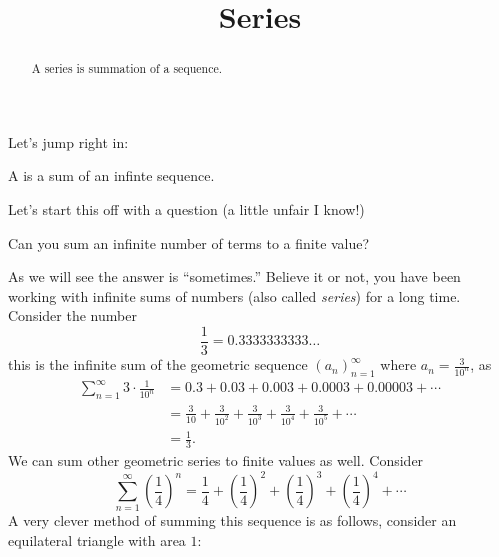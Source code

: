 \documentclass{ximera}
\title[Dig-In:]{Series}
\begin{document}
\begin{abstract}
A series is summation of a sequence.
\end{abstract}
\maketitle


Let's jump right in:


\begin{definition}
  A  is a sum of an infinte sequence.
\end{definition}


Let's start this off with a question (a little unfair I know!)

\begin{question}
  Can you sum an infinite number of terms to a finite value?
  \begin{prompt}
    \begin{multipleChoice}
    \end{multipleChoice}
  \end{prompt}
\end{question}
As we will see the answer is ``sometimes.''  Believe it or not, you
have been working with infinite sums of numbers (also called
\textit{series}) for a long time. Consider the number
\[
\frac{1}{3} = 0.3333333333\dots
\]
this is the infinite sum of the geometric sequence
$(a_n)_{n=1}^\infty$ where $a_n = \frac{3}{10^{n}}$, as
\begin{align*}
  \sum_{n=1}^\infty 3\cdot \frac{1}{10^{n}} &= 0.3 + 0.03+0.003+ 0.0003+ 0.00003+ \cdots\\
  &= \frac{3}{10} + \frac{3}{10^2} + \frac{3}{10^3} + \frac{3}{10^4} + \frac{3}{10^5} + \cdots\\
  &=\frac{1}{3}.
\end{align*}
We can sum other geometric series to finite values as well. Consider
\[
\sum_{n=1}^\infty \left(\frac{1}{4}\right)^n =
\frac{1}{4} + \left(\frac{1}{4}\right)^2 + \left(\frac{1}{4}\right)^3 + \left(\frac{1}{4}\right)^4 + \cdots 
\]
A very clever method of summing this sequence is as follows, consider
an equilateral triangle with area $1$:
\begin{image}
\end{image}
\end{document}
